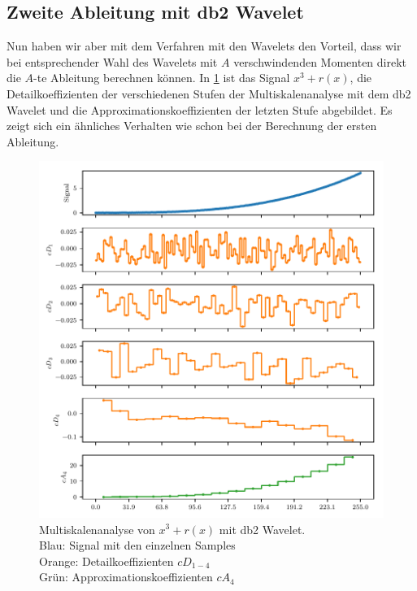\begin{refsection}
\subsection{Zweite Ableitung mit db2 Wavelet}

Nun haben wir aber mit dem Verfahren mit den Wavelets den Vorteil, dass wir bei
entsprechender Wahl des Wavelets mit $A$ verschwindenden Momenten direkt die
$A$-te Ableitung berechnen können.
In \cref{polynomials:noise:db2_multi} ist das Signal $x^3 + r(x)$, die
Detailkoeffizienten der verschiedenen Stufen der Multiskalenanalyse mit dem db2
Wavelet und die Approximationskoeffizienten der letzten Stufe abgebildet.
Es zeigt sich ein ähnliches Verhalten wie schon bei der Berechnung der ersten
Ableitung.

\begin{figure}
    \centering
    \includegraphics{papers/polynomials/images/polynomials_noise_db2_multi.pdf}
    \caption{Multiskalenanalyse von $x^3 + r(x)$ mit db2 Wavelet. \\
             Blau: Signal mit den einzelnen Samples\\
             Orange: Detailkoeffizienten $cD_{1-4}$ \\
             Grün: Approximationskoeffizienten $cA_4$\label{polynomials:noise:db2_multi}}
\end{figure}

\end{refsection}
